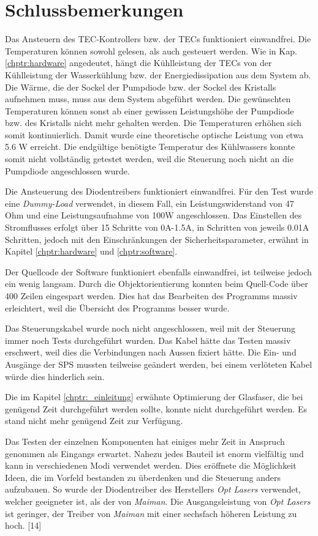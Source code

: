 \section{Schlussbemerkungen}
Das Ansteuern des TEC-Kontrollers bzw. der TECs funktioniert einwandfrei. Die Temperaturen können sowohl gelesen, als auch gesteuert werden. Wie in Kap. \ref{chptr:hardware} angedeutet, hängt die Kühlleistung der TECs von der Kühlleistung der Wasserkühlung bzw. der Energiedissipation aus dem System ab. Die Wärme, die der Sockel der Pumpdiode bzw. der Sockel des Kristalls aufnehmen muss, muss aus dem System abgeführt werden. Die gewünschten Temperaturen können sonst ab einer gewissen Leistungshöhe der Pumpdiode bzw. des Kristalls nicht mehr gehalten werden. Die Temperaturen erhöhen sich somit kontinuierlich.
Damit wurde eine theoretische optische Leistung von etwa 5.6 W erreicht. Die endgültige benötigte Temperatur des Kühlwassers konnte somit nicht vollständig getestet werden, weil die Steuerung noch nicht an die Pumpdiode angeschlossen wurde.

Die Ansteuerung des Diodentreibers funktioniert einwandfrei. Für den Test wurde eine \textit{Dummy-Load} verwendet, in diesem Fall, ein Leistungswiderstand von 47 Ohm und eine Leistungsaufnahme von 100W angeschlossen. Das Einstellen des Stromflusses erfolgt über 15 Schritte von 0A-1.5A, in Schritten von jeweils 0.01A Schritten, jedoch mit den Einschränkungen der Sicherheitsparameter, erwähnt in Kapitel \ref{chptr:hardware} und \ref{chptr:software}.

Der Quellcode der Software funktioniert ebenfalls einwandfrei, ist teilweise jedoch ein wenig langsam.
Durch die Objektorientierung konnten beim Quell-Code über 400 Zeilen eingespart werden. Dies hat das Bearbeiten des Programms massiv erleichtert, weil die Übersicht des Programms besser wurde.

Das Steuerungskabel wurde noch nicht angeschlossen, weil mit der Steuerung immer noch Tests durchgeführt wurden. Das Kabel hätte das Testen massiv erschwert, weil dies die Verbindungen nach Aussen fixiert hätte. Die Ein- und Ausgänge der SPS mussten teilweise geändert werden, bei einem verlöteten Kabel würde dies hinderlich sein.

Die im Kapitel \ref{chptr:_einleitung} erwähnte Optimierung der Glasfaser, die bei genügend Zeit durchgeführt werden sollte, konnte nicht durchgeführt werden. Es stand nicht mehr genügend Zeit zur Verfügung.

Das Testen der einzelnen Komponenten hat einiges mehr Zeit in Anspruch genommen als Eingangs erwartet. Nahezu jedes Bauteil ist enorm vielfältig und kann in verschiedenen Modi verwendet werden. Dies eröffnete die Möglichkeit Ideen, die im Vorfeld bestanden zu überdenken und die Steuerung anders aufzubauen. So wurde der Diodentreiber des Herstellers \textit{Opt Lasers} verwendet, welcher geeigneter ist, als der von \textit{Maiman}. Die Ausgangsleistung von \textit{Opt Lasers} ist geringer, der Treiber von \textit{Maiman} mit einer sechsfach höheren Leistung zu hoch. [14]


